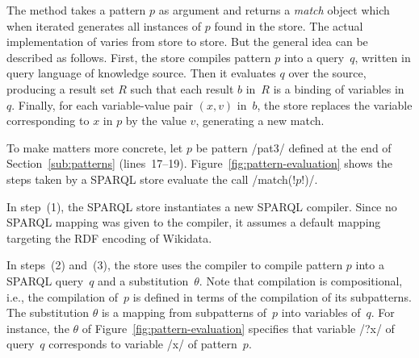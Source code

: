 The  method takes a pattern $p$ as argument and returns a \emph{match} object which when iterated generates all instances of $p$ found in the store.
The actual implementation of  varies from store to store.
But the general idea can be described as follows.
First, the store compiles pattern $p$ into a query~$q$, written in query language of knowledge source.
Then it evaluates $q$ over the source, producing a result set $R$ such that each result $b$ in~$R$ is a binding of variables in~$q$.
Finally, for each variable-value pair $(x,v)$ in~$b$, the store replaces the variable corresponding to $x$ in $p$ by the value $v$, generating a new match.




To make matters more concrete, let $p$ be pattern \code/pat3/ defined at the end of Section~\ref{sub:patterns} (lines~17--19).
Figure~\ref{fig:pattern-evaluation} shows the steps taken by a SPARQL store evaluate the call \code/match(!$p$!)/.


In step~(1), the SPARQL store instantiates a new SPARQL compiler.
Since no SPARQL mapping was given to the compiler, it assumes a default mapping targeting the RDF encoding of Wikidata.


In steps~(2) and~(3), the store uses the compiler to compile pattern $p$ into a SPARQL query~$q$ and a substitution~$\theta$.
Note that compilation is compositional, i.e., the compilation of~$p$ is defined in terms of the compilation of its subpatterns.
The substitution $\theta$ is a mapping from subpatterns of~$p$ into variables of~$q$.
For instance, the $\theta$ of Figure~\ref{fig:pattern-evaluation} specifies that variable \code/?x/ of query~$q$ corresponds to variable \code/x/ of pattern~$p$.


